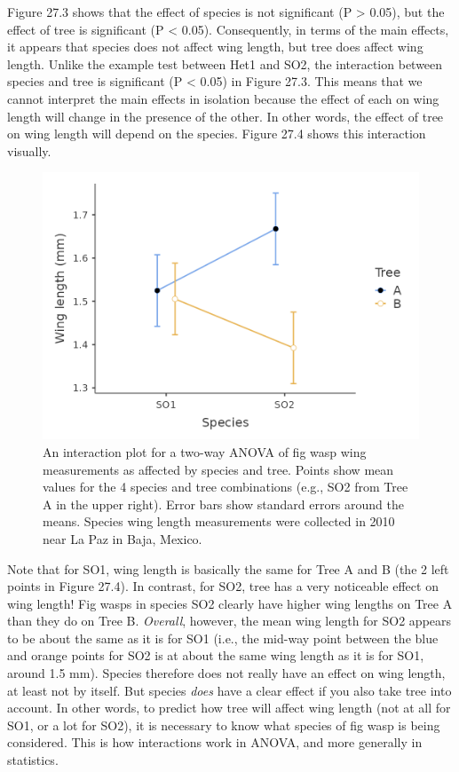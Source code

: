\documentclass[
  openany]{krantz}
\begin{document}
Figure 27.3 shows that the effect of species is not significant (P \textgreater{} 0.05), but the effect of tree is significant (P \textless{} 0.05).
Consequently, in terms of the main effects, it appears that species does not affect wing length, but tree does affect wing length.
Unlike the example test between Het1 and SO2, the interaction between species and tree is significant (P \textless{} 0.05) in Figure 27.3.
This means that we cannot interpret the main effects in isolation because the effect of each on wing length will change in the presence of the other.
In other words, the effect of tree on wing length will depend on the species.
Figure 27.4 shows this interaction visually.

\begin{figure}
\includegraphics[width=1\linewidth]{img/two-way_ANOVA_with_interaction} \caption{An interaction plot for a two-way ANOVA of fig wasp wing measurements as affected by species and tree. Points show mean values for the 4 species and tree combinations (e.g., SO2 from Tree A in the upper right). Error bars show standard errors around the means. Species wing length measurements were collected in 2010 near La Paz in Baja, Mexico.}\label{fig:unnamed-chunk-111}
\end{figure}

Note that for SO1, wing length is basically the same for Tree A and B (the 2 left points in Figure 27.4).
In contrast, for SO2, tree has a very noticeable effect on wing length!
Fig wasps in species SO2 clearly have higher wing lengths on Tree A than they do on Tree B.
\emph{Overall}, however, the mean wing length for SO2 appears to be about the same as it is for SO1 (i.e., the mid-way point between the blue and orange points for SO2 is at about the same wing length as it is for SO1, around 1.5 mm).
Species therefore does not really have an effect on wing length, at least not by itself.
But species \emph{does} have a clear effect if you also take tree into account.
In other words, to predict how tree will affect wing length (not at all for SO1, or a lot for SO2), it is necessary to know what species of fig wasp is being considered.
This is how interactions work in ANOVA, and more generally in statistics.
\end{document}
